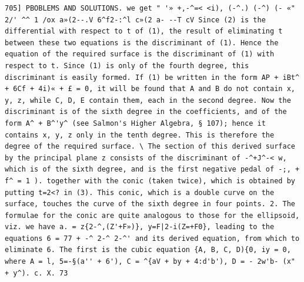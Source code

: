 \documentclass[11pt,a4paper]{book}
\begin{document}
\newpage
\setcounter{page}{577}
\begin{verbatim}
705] PBOBLEMS AND SOLUTIONS. we get " '» +,-^=< <i), (-^.) (-^) (- «" 2/' ^^ 1 /ox a»(2--.V 6^f2-:^l c»(2 a- --T cV Since (2) is the differential with respect to t of (1), the result of eliminating t between these two equations is the discriminant of (1). Hence the equation of the required surface is the discriminant of (1) with respect to t. Since (1) is only of the fourth degree, this discriminant is easily formed. If (1) be written in the form AP + iBt^ + 6Cf + 4i)« + £ = 0, it will be found that A and B do not contain x, y, z, while C, D, E contain them, each in the second degree. Now the discriminant is of the sixth degree in the coefficients, and of the form A^ + B^'y^ (see Salmon's Higher Algebra, § 107); hence it contains x, y, z only in the tenth degree. This is therefore the degree of the required surface. \ The section of this derived surface by the principal plane z consists of the discriminant of -^+J^-< w, which is of the sixth degree, and is the first negative pedal of -;, + f^ = 1 ). together with the conic (taken twice), which is obtained by putting t=2<? in (3). This conic, which is a double curve on the surface, touches the curve of the sixth degree in four points. 2. The formulae for the conic are quite analogous to those for the ellipsoid, viz. we have a. = z{2-^,(Z'+F»)}, y=F|2-i(Z=+F0}, leading to the equations 6 = 77 + -^ 2-^ 2-^' and its derived equation, from which to eliminate 6. The first is the cubic equation {A, B, C, D){0, iy = 0, where A = l, 5=-§(a'' + 6'), C = ^{aV + by + 4:d'b'), D = - 2w'b- (x" + y^). c. X. 73 
\end{verbatim}
\end{document}
